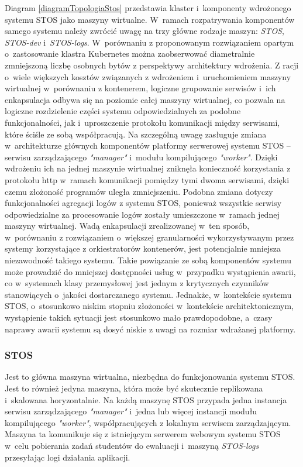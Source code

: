 \noindent Diagram \ref{diagramTopologiaStos} przedstawia klaster i~komponenty wdrożonego systemu STOS jako maszyny wirtualne. W~ramach rozpatrywania komponentów samego systemu należy zwrócić uwagę na trzy główne rodzaje maszyn: \textit{STOS}, \textit{STOS-dev} i~\textit{STOS-logs}. W~porównaniu z proponowanym rozwiązaniem opartym o~zastosowanie klastra Kubernetes można zaobserwować diametralnie zmniejszoną liczbę osobnych bytów z perspektywy architektury wdrożenia. Z racji o~wiele większych kosztów związanych z wdrożeniem i~uruchomieniem maszyny wirtualnej w~porównaniu z kontenerem, logiczne grupowanie serwisów i~ich enkapsulacja odbywa się na poziomie całej maszyny wirtualnej, co pozwala na logiczne rozdzielenie części systemu odpowiedzialnych za podobne funkcjonalności, jak i~uproszczenie protokołu komunikacji między serwisami, które ściśle ze sobą współpracują. Na szczególną uwagę zasługuje zmiana w~architekturze głównych komponentów platformy serwerowej systemu STOS -- serwisu zarządzającego \textit{"manager"} i~modułu kompilującego \textit{"worker"}. Dzięki wdrożeniu ich na jednej maszynie wirtualnej zniknęła konieczność korzystania z protokołu http w~ramach komunikacji pomiędzy tymi dwoma serwisami, dzięki czemu złożoność programów uległa zmniejszeniu. Podobna zmiana dotyczy funkcjonalności agregacji logów z systemu STOS, ponieważ wszystkie serwisy odpowiedzialne za procesowanie logów zostały umieszczone w~ramach jednej maszyny wirtualnej.
\noindent Wadą enkapsulacji zrealizowanej w~ten sposób, w~porównaniu z rozwiązaniem o~większej granularności wykorzystywanym przez systemy korzystające z orkiestratorów kontenerów, jest potencjalnie mniejsza niezawodność takiego systemu. Takie powiązanie ze sobą komponentów systemu może prowadzić do mniejszej dostępności usług w~przypadku wystąpienia awarii, co w~systemach klasy przemysłowej jest jednym z krytycznych czynników stanowiących o~jakości dostarczanego systemu. Jednakże, w~kontekście systemu STOS, o~stosunkowo niskim stopniu złożoności w~kontekście architektonicznym, wystąpienie takich sytuacji jest stosunkowo mało prawdopodobne, a~czasy naprawy awarii systemu są dosyć niskie z uwagi na rozmiar wdrażanej platformy.

\subsubsection{STOS}
Jest to główna maszyna wirtualna, niezbędna do funkcjonowania systemu STOS. Jest to również jedyna maszyna, która może być skutecznie replikowana i~skalowana horyzontalnie. Na każdą maszynę STOS przypada jedna instancja serwisu zarządzającego \textit{"manager"} i~jedna lub więcej instancji modułu kompilującego \textit{"worker"}, współpracujących z lokalnym serwisem zarządzającym. Maszyna ta komunikuje się z istniejącym serwerem webowym systemu STOS w~celu pobierania zadań studentów do ewaluacji i~maszyną \textit{STOS-logs} przesyłając logi działania aplikacji.

